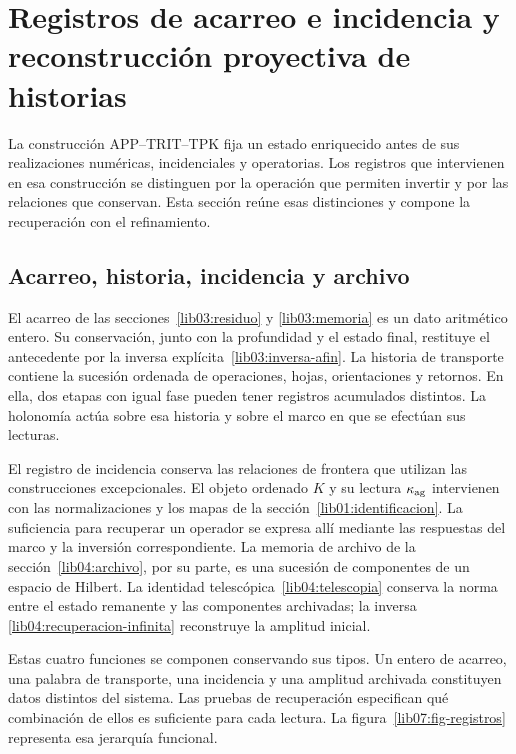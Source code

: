 \section{Registros de acarreo e incidencia y reconstrucción proyectiva de historias}
\label{lib07:armonizacion}
La construcción APP--TRIT--TPK fija un estado enriquecido antes de
sus realizaciones numéricas, incidenciales y operatorias. Los registros
que intervienen en esa construcción se distinguen por la operación
que permiten invertir y por las relaciones que conservan. Esta sección
reúne esas distinciones y compone la recuperación con el refinamiento.

\subsection{Acarreo, historia, incidencia y archivo}
El acarreo de las secciones~\ref{lib03:residuo} y
\ref{lib03:memoria} es un dato aritmético entero. Su conservación,
junto con la profundidad y el estado final, restituye el antecedente
por la inversa explícita~\eqref{lib03:inversa-afin}.
La historia de transporte contiene la sucesión ordenada de operaciones,
hojas, orientaciones y retornos. En ella, dos etapas con igual fase
pueden tener registros acumulados distintos. La holonomía actúa sobre
esa historia y sobre el marco en que se efectúan sus lecturas.

El registro de incidencia conserva las relaciones de frontera que
utilizan las construcciones excepcionales. El objeto ordenado \(K\)
y su lectura \(\kappa_{\rm ag}\) intervienen con las normalizaciones
y los mapas de la sección~\ref{lib01:identificacion}.
La suficiencia para recuperar un operador se expresa allí mediante
las respuestas del marco y la inversión correspondiente.
La memoria de archivo de la sección~\ref{lib04:archivo}, por su parte,
es una sucesión de componentes de un espacio de Hilbert. La identidad
telescópica~\eqref{lib04:telescopia} conserva la norma entre el estado
remanente y las componentes archivadas; la inversa
\eqref{lib04:recuperacion-infinita} reconstruye la amplitud inicial.

Estas cuatro funciones se componen conservando sus tipos.
Un entero de acarreo, una palabra de transporte, una incidencia
y una amplitud archivada constituyen datos distintos del sistema.
Las pruebas de recuperación especifican qué combinación de ellos
es suficiente para cada lectura. La figura~\ref{lib07:fig-registros}
representa esa jerarquía funcional.

